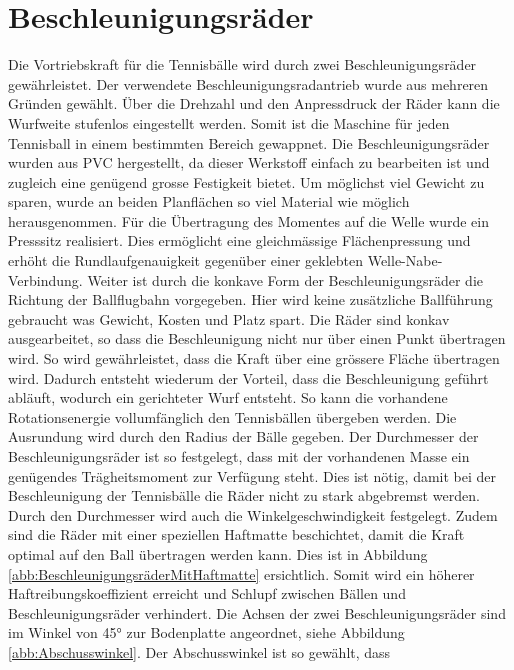 \section{Beschleunigungsräder}
    Die Vortriebskraft für die Tennisbälle wird durch zwei Beschleunigungsräder gewährleistet. Der verwendete
    Beschleunigungsradantrieb wurde aus mehreren Gründen gewählt. Über die Drehzahl und den 
    Anpressdruck der Räder kann die Wurfweite stufenlos eingestellt werden. Somit ist die Maschine 
    für jeden Tennisball in einem bestimmten Bereich gewappnet. Die Beschleunigungsräder wurden 
    aus PVC hergestellt, da dieser Werkstoff einfach zu bearbeiten ist und zugleich eine genügend 
    grosse Festigkeit bietet. Um möglichst viel Gewicht zu sparen, wurde an beiden Planflächen so 
    viel Material wie möglich herausgenommen. Für die Übertragung des Momentes auf die Welle wurde 
    ein Presssitz realisiert. Dies ermöglicht eine gleichmässige Flächenpressung und erhöht die 
    Rundlaufgenauigkeit gegenüber einer geklebten Welle-Nabe-Verbindung. Weiter ist durch die konkave Form der 
    Beschleunigungsräder die Richtung der Ballflugbahn vorgegeben. Hier wird keine zusätzliche Ballführung 
    gebraucht was Gewicht, Kosten und Platz spart. Die Räder sind konkav ausgearbeitet, so dass die 
    Beschleunigung nicht nur über einen Punkt übertragen wird. So wird gewährleistet, dass die Kraft 
    über eine grössere Fläche übertragen wird. Dadurch entsteht wiederum der Vorteil, dass die 
    Beschleunigung geführt abläuft, wodurch ein gerichteter Wurf entsteht. So kann die vorhandene 
    Rotationsenergie vollumfänglich den Tennisbällen übergeben werden. Die Ausrundung wird durch 
    den Radius der Bälle gegeben. Der Durchmesser der Beschleunigungsräder ist so festgelegt, dass 
    mit der vorhandenen Masse ein genügendes Trägheitsmoment zur Verfügung steht. Dies ist nötig, 
    damit bei der Beschleunigung der Tennisbälle die Räder nicht zu stark abgebremst werden. Durch 
    den Durchmesser wird auch die Winkelgeschwindigkeit festgelegt. Zudem sind die Räder mit einer 
    speziellen Haftmatte beschichtet, damit die 
    Kraft optimal auf den Ball übertragen werden kann. Dies ist in Abbildung \ref{abb:BeschleunigungsräderMitHaftmatte} ersichtlich. Somit wird ein höherer Haftreibungskoeffizient 
    erreicht und Schlupf zwischen Bällen und Beschleunigungsräder verhindert. Die Achsen der zwei Beschleunigungsräder sind im 
    Winkel von 45\si{\degree} zur Bodenplatte angeordnet, siehe Abbildung \ref{abb:Abschusswinkel}. 
    Der Abschusswinkel ist so gewählt, dass 
